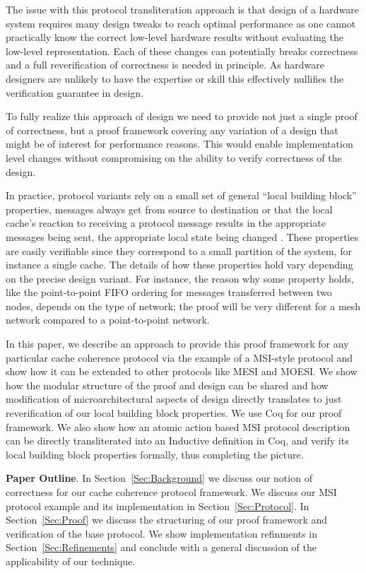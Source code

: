The issue with this protocol transliteration approach is that design
of a hardware system requires many design tweaks to reach optimal
performance as one cannot practically know the correct low-level
hardware results without evaluating the low-level representation.
Each of these changes can potentially breaks correctness and a full
reverification of correctness is needed in principle. As hardware
designers are unlikely to have the expertise or skill this effectively
nullifies the verification guarantee in design.

To fully realize this approach of design we need to provide not just a
single proof of correctness, but a proof framework covering any
variation of a design that might be of interest for performance
reasons. This would enable implementation level changes without
compromising on the ability to verify correctness of the design.

In practice, protocol variants rely on a small set of general ``local
building block'' properties, \eg{} messages always get from source to
destination or that the local cache's reaction to receiving a protocol
message results in the appropriate messages being sent, the
appropriate local state being changed \etc{}.  These properties are
easily verifiable since they correspond to a small partition of the
system, for instance a single cache.  The details of how these
properties hold vary depending on the precise design variant. For
instance, the reason why some property holds, like the point-to-point
FIFO ordering for messages transferred between two nodes, depends on
the type of network; the proof will be very different for a mesh
network compared to a point-to-point network.

In this paper, we describe an approach to provide this proof framework
for any particular cache coherence protocol via the example of a
MSI-style protocol and show how it can be extended to other protocols
like MESI and MOESI. We show how the modular structure of the proof
and design can be shared and how modification of microarchitectural
aspects of design directly translates to just reverification of our
local building block properties. We use Coq for our proof
framework. We also show how an atomic action based MSI protocol
description can be directly transliterated into an Inductive
definition in Coq, and verify its local building block properties
formally, thus completing the picture.

\noindent\textbf{Paper Outline}. In Section~\ref{Sec:Background} we
discuss our notion of correctness for our cache coherence protocol
framework. We discuss our MSI protocol example and its implementation
in Section~\ref{Sec:Protocol}. In Section~\ref{Sec:Proof} we discuss
the structuring of our proof framework and verification of the base
protocol. We show implementation refinments in
Section~\ref{Sec:Refinements} and conclude with a general discussion
of the applicability of our technique.
